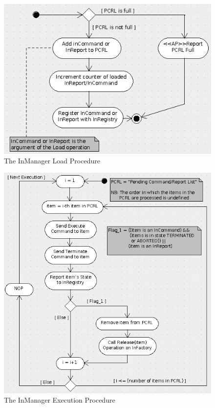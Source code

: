 \documentclass[a4paper,10pt]{article}
\begin{document}
\begin{figure}[h]
 \centering
 \includegraphics[scale=0.35,keepaspectratio=true]{InManagerLoad.png}
 \caption{The InManager Load Procedure}
 \label{fig:InManagerLoad}
\end{figure}

\begin{figure}[h]
 \centering
 \includegraphics[scale=0.35,keepaspectratio=true]{InManagerExecution.png}
 \caption{The InManager Execution Procedure}
 \label{fig:InManagerExecution}
\end{figure}
\end{document}
